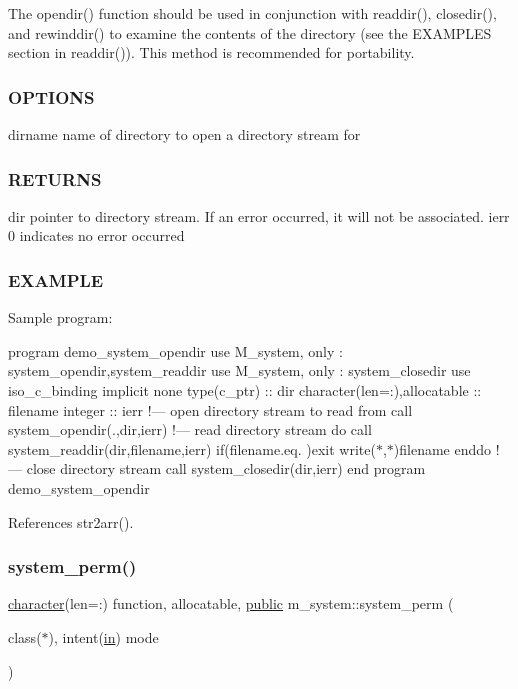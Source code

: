 The opendir() function should be used in conjunction with readdir(), closedir(), and rewinddir() to examine the contents of the directory (see the E\+X\+A\+M\+P\+L\+ES section in readdir()). This method is recommended for portability. \subsubsection*{O\+P\+T\+I\+O\+NS}

dirname name of directory to open a directory stream for \subsubsection*{R\+E\+T\+U\+R\+NS}

dir pointer to directory stream. If an error occurred, it will not be associated. ierr 0 indicates no error occurred \subsubsection*{E\+X\+A\+M\+P\+LE}

Sample program\+:

program demo\+\_\+system\+\_\+opendir use M\+\_\+system, only \+: system\+\_\+opendir,system\+\_\+readdir use M\+\_\+system, only \+: system\+\_\+closedir use iso\+\_\+c\+\_\+binding implicit none type(c\+\_\+ptr) \+:\+: dir character(len=\+:),allocatable \+:\+: filename integer \+:\+: ierr !--- open directory stream to read from call system\+\_\+opendir(\textquotesingle{}.\textquotesingle{},dir,ierr) !--- read directory stream do call system\+\_\+readdir(dir,filename,ierr) if(filename.\+eq.\textquotesingle{} \textquotesingle{})exit write($\ast$,$\ast$)filename enddo !--- close directory stream call system\+\_\+closedir(dir,ierr) end program demo\+\_\+system\+\_\+opendir 

References str2arr().

\mbox{\label{namespacem__system_ae8f39e1d4e420396319105e4e81f92b5}} 
\subsubsection{\texorpdfstring{system\+\_\+perm()}{system\_perm()}}
{\footnotesize\ttfamily \hyperlink{option__stopwatch_83_8txt_abd4b21fbbd175834027b5224bfe97e66}{character}(len=\+:) function, allocatable, \hyperlink{M__stopwatch_83_8txt_a2f74811300c361e53b430611a7d1769f}{public} m\+\_\+system\+::system\+\_\+perm (\begin{DoxyParamCaption}\item[{class($\ast$), intent(\hyperlink{M__journal_83_8txt_afce72651d1eed785a2132bee863b2f38}{in})}]{mode }\end{DoxyParamCaption})}




